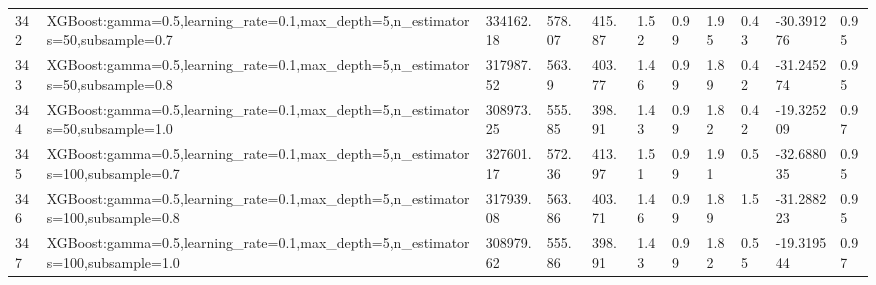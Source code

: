 \begin{longtable}{C{0.8cm} L{2cm} C{1.15cm} C{1.15cm} C{1.15cm} C{1.15cm} C{0.85cm} C{1.25cm} C{1.2cm} C{1.5cm} C{1.0cm}}
342 & XGBoost:\newline gamma=0.5,\newline learning\_rate=0.1,\newline max\_depth=5,\newline n\_estimators=50,\newline subsample=0.7 & 334162.18 & 578.07 & 415.87 & 1.52 & 0.99 & 1.95 & 0.43 & -30.391276 & 0.95 \\
343 & XGBoost:\newline gamma=0.5,\newline learning\_rate=0.1,\newline max\_depth=5,\newline n\_estimators=50,\newline subsample=0.8 & 317987.52 & 563.9 & 403.77 & 1.46 & 0.99 & 1.89 & 0.42 & -31.245274 & 0.95 \\
344 & XGBoost:\newline gamma=0.5,\newline learning\_rate=0.1,\newline max\_depth=5,\newline n\_estimators=50,\newline subsample=1.0 & 308973.25 & 555.85 & 398.91 & 1.43 & 0.99 & 1.82 & 0.42 & -19.325209 & 0.97 \\
345 & XGBoost:\newline gamma=0.5,\newline learning\_rate=0.1,\newline max\_depth=5,\newline n\_estimators=100,\newline subsample=0.7 & 327601.17 & 572.36 & 413.97 & 1.51 & 0.99 & 1.91 & 0.5 & -32.688035 & 0.95 \\
346 & XGBoost:\newline gamma=0.5,\newline learning\_rate=0.1,\newline max\_depth=5,\newline n\_estimators=100,\newline subsample=0.8 & 317939.08 & 563.86 & 403.71 & 1.46 & 0.99 & 1.89 & 1.5 & -31.288223 & 0.95 \\
347 & XGBoost:\newline gamma=0.5,\newline learning\_rate=0.1,\newline max\_depth=5,\newline n\_estimators=100,\newline subsample=1.0 & 308979.62 & 555.86 & 398.91 & 1.43 & 0.99 & 1.82 & 0.55 & -19.319544 & 0.97 \\

\end{longtable}
